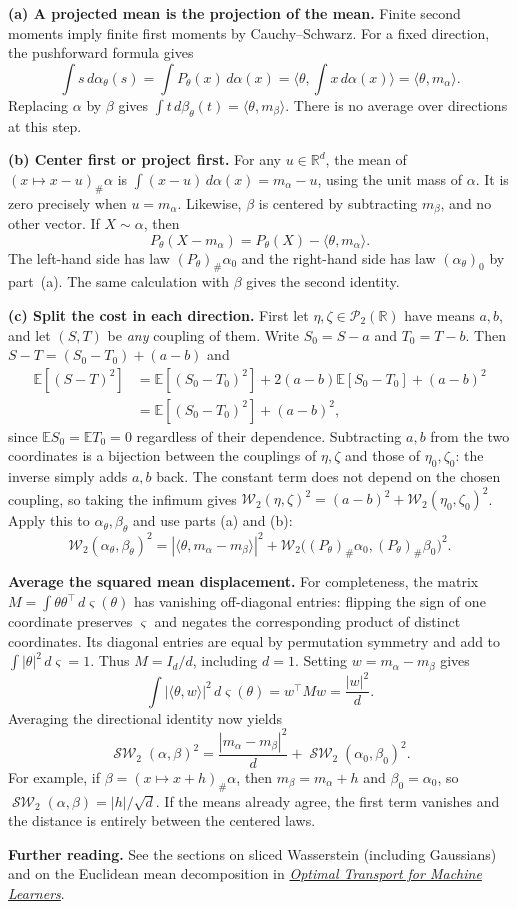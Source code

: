 \documentclass[11pt,a4paper]{article}
\theoremstyle{exostyle}
\newcommand{\R}{\mathbb{R}}
\newcommand{\push}{\#}
\newcommand{\Wtwo}{\mathcal{W}_2}
\newcommand{\ip}[2]{\langle #1,#2\rangle}
\DeclareMathOperator{\SW}{\mathcal{SW}}
\newcommand{\EE}{\mathbb E}
\newcommand{\PPtwo}{\mathcal P_2}
\begin{document}
\begin{solution}
\textbf{(a) A projected mean is the projection of the mean.}
Finite second moments imply finite first moments by Cauchy--Schwarz.
For a fixed direction, the pushforward formula gives
\[
  \int s\,d\alpha_\theta(s)
     =\int P_\theta(x)\,d\alpha(x)
     =\ip{\theta}{\int x\,d\alpha(x)}
     =\ip{\theta}{m_\alpha}.
\]
Replacing $\alpha$ by $\beta$ gives $\int t\,d\beta_\theta(t)=
\ip{\theta}{m_\beta}$. There is no average over directions at this step.

\textbf{(b) Center first or project first.}
For any $u\in\R^d$, the mean of $(x\mapsto x-u)_\push\alpha$ is
$\int(x-u)\,d\alpha(x)=m_\alpha-u$, using the unit mass of $\alpha$.
It is zero precisely when $u=m_\alpha$. Likewise, $\beta$ is centered
by subtracting $m_\beta$, and no other vector. If $X\sim\alpha$, then
\[
  P_\theta(X-m_\alpha)
    =P_\theta(X)-\ip{\theta}{m_\alpha}.
\]
The left-hand side has law $(P_\theta)_\push\alpha_0$ and the
right-hand side has law $(\alpha_\theta)_0$ by part~(a).
The same calculation with $\beta$ gives the second identity.

\par{}
\textbf{(c) Split the cost in each direction.}
First let $\eta,\zeta\in\PPtwo(\R)$ have means $a,b$, and let
$(S,T)$ be \emph{any} coupling of them. Write $S_0=S-a$ and $T_0=T-b$.
Then $S-T=(S_0-T_0)+(a-b)$ and
\begin{align*}
  \EE[(S-T)^2]
    &=\EE[(S_0-T_0)^2]+2(a-b)\EE[S_0-T_0]+(a-b)^2\\
    &=\EE[(S_0-T_0)^2]+(a-b)^2,
\end{align*}
since $\EE S_0=\EE T_0=0$ regardless of their dependence.
Subtracting $a,b$ from the two coordinates is a bijection between
the couplings of $\eta,\zeta$ and those of $\eta_0,\zeta_0$:
the inverse simply adds $a,b$ back. The constant term does not depend
on the chosen coupling, so taking the infimum gives
$\Wtwo(\eta,\zeta)^2=(a-b)^2+\Wtwo(\eta_0,\zeta_0)^2$.
Apply this to $\alpha_\theta,\beta_\theta$ and use parts (a) and (b):
\[
  \Wtwo(\alpha_\theta,\beta_\theta)^2
    =|\ip{\theta}{m_\alpha-m_\beta}|^2+
      \Wtwo\bigl((P_\theta)_\push\alpha_0,(P_\theta)_\push\beta_0\bigr)^2.
\]

\textbf{Average the squared mean displacement.}
For completeness, the matrix $M=\int\theta\theta^\top\,d\varsigma(\theta)$
has vanishing off-diagonal entries: flipping the sign of one
coordinate preserves $\varsigma$ and negates the corresponding
product of distinct coordinates. Its diagonal entries are equal by
permutation symmetry and add to $\int|\theta|^2\,d\varsigma=1$.
Thus $M=I_d/d$, including $d=1$. Setting $w=m_\alpha-m_\beta$ gives
\[
  \int|\ip{\theta}{w}|^2\,d\varsigma(\theta)
     =w^\top M w=\frac{|w|^2}{d}.
\]
Averaging the directional identity now yields
\[
  \boxed{\SW_2(\alpha,\beta)^2
    =\frac{|m_\alpha-m_\beta|^2}{d}+\SW_2(\alpha_0,\beta_0)^2.}
\]
For example, if $\beta=(x\mapsto x+h)_\push\alpha$, then
$m_\beta=m_\alpha+h$ and $\beta_0=\alpha_0$, so
$\SW_2(\alpha,\beta)=|h|/\sqrt d$. If the means already agree, the first
term vanishes and the distance is entirely between the centered laws.
\end{solution}

\par\addvspace{7pt}
\textbf{Further reading.}
See the sections on sliced Wasserstein (including Gaussians) and on
the Euclidean mean decomposition in
\href{https://www.gpeyre.com/ot4ml/OT4ML/OT4ML.pdf}
     {\emph{Optimal Transport for Machine Learners}}.
\end{document}
